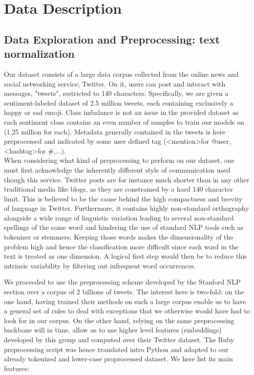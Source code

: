 \documentclass[10pt,conference,compsocconf,retainorgcmds]{IEEEtran}
\begin{document}
\section{Data Description}
 \label{sec:structure-paper}
\subsection{Data Exploration and Preprocessing: text normalization}

Our dataset consists of a large data corpus collected from the online news and social networking service, Twitter. On it, users can post and interact with messages, "tweets", restricted to 140 characters. Specifically, we are given a sentiment-labeled dataset of 2.5 million tweets, each containing exclusively a happy or sad emoji.  Class imbalance is not an issue in the provided dataset as each sentiment class contains an even number of samples to train our models on (1.25 million for each). Metadata generally contained in the tweets is here preprocessed and indicated by some user defined tag (\textless  mention\textgreater  for @user, \textless hashtag\textgreater  for \#,...).\\

When considering what kind of preprocessing to perform on our dataset, one must first acknowledge the inherently different style of communication used though this service.  Twitter posts are for instance much shorter than in any other traditional media like blogs, as they are constrained by a hard 140 character limit. This is believed to be the cause behind the high compactness and brevity of language in Twitter. Furthermore, it contains highly non-standard orthography alongside a wide range of linguistic variation leading to several non-standard spellings of the same word and hindering the use of standard NLP tools such as tokenizer or stemmers. Keeping those words makes the dimensionality of the problem high and hence the classification more difficult since each word in the text is treated as one dimension. A logical first step would then be to reduce this intrinsic variability by filtering out infrequent word occurrences.

We proceeded to use the preprocessing scheme developed by the Stanford NLP section over a corpus of 2 billions of tweets. The interest here is two-fold: on the one hand,  having trained their methods on such a large corpus enable us to have a general set of rules to deal with exceptions that we otherwise would have had to look for in our corpus. On the other hand, relying on the same preprocessing backbone will in time, allow us to use higher level features (embeddings) developed by this group and computed over their Twitter dataset. The Ruby preprocessing script was hence translated intro Python and adapted to our already tokenized and lower-case proprocessed dataset. We here list its main features:
\end{document}
